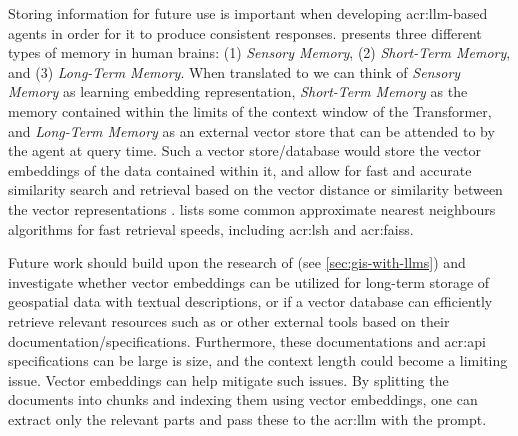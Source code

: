 Storing information for future use is important when developing \acrshort{acr:llm}-based agents in order for it to produce consistent responses. \cite{wengLLMPoweredAutonomous2023} presents three different types of memory in human brains: (1) \textit{Sensory Memory}, (2) \textit{Short-Term Memory}, and (3) \textit{Long-Term Memory}. When translated to  we can think of \textit{Sensory Memory} as learning embedding representation, \textit{Short-Term Memory} as the memory contained within the limits of the context window of the Transformer, and  \textit{Long-Term Memory} as an external vector store that can be attended to by the agent at query time. Such a vector store/database would store the vector embeddings of the data contained within it, and allow for fast and accurate similarity search and retrieval based on the vector distance or similarity between the vector representations \citep{evchakiVectorDatabase2023}. \cite{wengLLMPoweredAutonomous2023} lists some common approximate nearest neighbours algorithms for fast retrieval speeds, including \gls{acr:lsh} and \gls{acr:faiss}.

Future work should build upon the research of \cite{unluChatmapLargeLanguage2023} (see \autoref{sec:gis-with-llms}) and investigate whether vector embeddings can be utilized for long-term storage of geospatial data with textual descriptions, or if a vector database can efficiently retrieve relevant resources such as  or other external tools based on their documentation/specifications. Furthermore, these documentations and \acrshort{acr:api} specifications can be large is size, and the context length could become a limiting issue. Vector embeddings can help mitigate such issues. By splitting the documents into chunks and indexing them using vector embeddings, one can extract only the relevant parts and pass these to the \acrshort{acr:llm} with the prompt.

\glsaddall